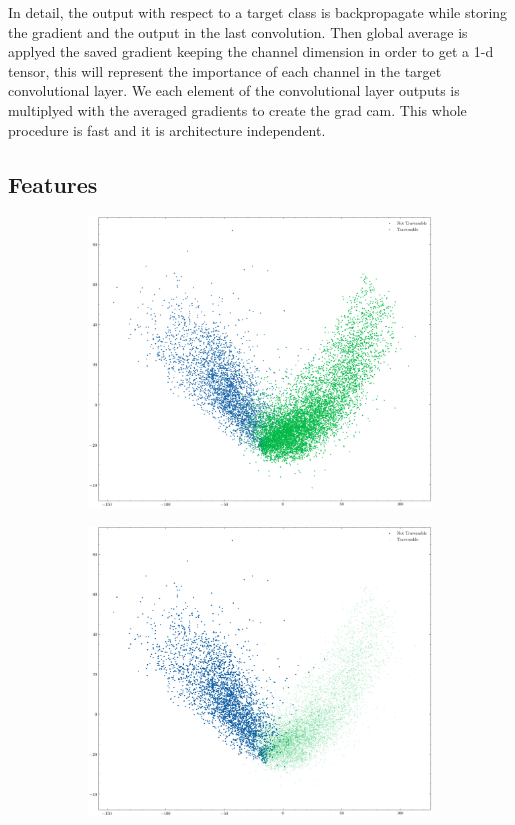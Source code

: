 \documentclass[../document.tex]{subfiles}
\begin{document}
In detail, the output with respect to a target class is backpropagate while storing the gradient and the output in the last convolution. Then global average is applyed the saved gradient keeping the channel dimension in order to get a 1-d tensor, this will represent the importance of each channel in the target convolutional layer. We  each element of the convolutional layer outputs is multiplyed with the averaged gradients to create the grad cam. This whole procedure is fast and it is architecture independent.

\subsection{Features}
\begin{figure}[H]
    \centering
    \begin{subfigure}[b]{1\textwidth}
        \includegraphics[width=\linewidth]{../img/5/pca/pca.png}
    \end{subfigure}
    \begin{subfigure}[b]{0.48\textwidth}
        \includegraphics[width=\linewidth]{../img/5/pca/pca-0.png}

\end{subfigure}
\end{figure}
\end{document}
